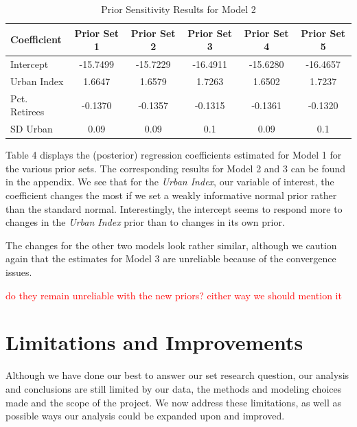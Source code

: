 \documentclass[12pt]{article}
\newcommand{\red}[1]{\textcolor{red}{#1}}
\begin{document}
\begin{table}[h]
    \centering
    \begin{tabular}{l|ccccc}
        \hline
        Coefficient    & Prior Set 1 & Prior Set 2 & Prior Set 3 & Prior Set 4 & Prior Set 5 \\
        \hline
        Intercept      & -15.7499 & -15.7229 & -16.4911 & -15.6280 & -16.4657 \\
        Urban Index    & 1.6647 & 1.6579 & 1.7263 & 1.6502 & 1.7237 \\
        Pct. Retirees  & -0.1370 & -0.1357 & -0.1315 & -0.1361 & -0.1320 \\
        SD Urban       & 0.09    & 0.09    & 0.1     & 0.09    & 0.1     \\
        \hline
    \end{tabular}
    \caption{Prior Sensitivity Results for Model 2}
    \label{tab:Prior Sensitivity Results for Model 2}
\end{table}



Table 4 displays the (posterior) regression coefficients estimated for Model 1 for the various prior sets. The corresponding results for Model 2 and 3 can be found in the appendix. We see that for the \textit{Urban Index}, our variable of interest, the coefficient changes the most if we set a weakly informative normal prior rather than the standard normal. Interestingly, the intercept seems to respond more to changes in the \textit{Urban Index} prior than to changes in its own prior.

The changes for the other two models look rather similar, although we caution again that the estimates for Model 3 are unreliable because of the convergence issues.

\red{do they remain unreliable with the new priors? either way we should mention it}






\section{Limitations and Improvements}


Although we have done our best to answer our set research question, our analysis and conclusions are still limited by our data, the methods and modeling choices made and the scope of the project.
We now address these limitations, as well as possible ways our analysis could be expanded upon and improved.
\end{document}
